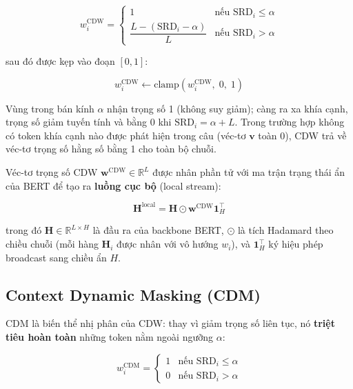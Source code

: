 \begin{equation}
  w_i^{\mathrm{CDW}} = \begin{cases}
    1 & \text{nếu } \mathrm{SRD}_i \leq \alpha \\[6pt]
    \dfrac{L - (\mathrm{SRD}_i - \alpha)}{L}
      & \text{nếu } \mathrm{SRD}_i > \alpha
  \end{cases}
  \label{eq:cdw}
\end{equation}

\noindent sau đó được kẹp vào đoạn $[0, 1]$:

\begin{equation}
  w_i^{\mathrm{CDW}} \leftarrow \mathrm{clamp}\!\left(
    w_i^{\mathrm{CDW}},\; 0,\; 1
  \right)
  \label{eq:cdw_clamp}
\end{equation}

Vùng trong bán kính $\alpha$ nhận trọng số 1 (không suy giảm); càng
ra xa khía cạnh, trọng số giảm tuyến tính và bằng 0 khi
$\mathrm{SRD}_i = \alpha + L$.  Trong trường hợp không có token khía
cạnh nào được phát hiện trong câu (véc-tơ $\mathbf{v}$ toàn 0), CDW
trả về véc-tơ trọng số hằng số bằng 1 cho toàn bộ chuỗi.

Véc-tơ trọng số CDW $\mathbf{w}^{\mathrm{CDW}} \in \mathbb{R}^L$ được
nhân phần tử với ma trận trạng thái ẩn của BERT để tạo ra
\textbf{luồng cục bộ} (local stream):

\begin{equation}
  \mathbf{H}^{\mathrm{local}} = \mathbf{H} \odot
    \mathbf{w}^{\mathrm{CDW}} \mathbf{1}_{H}^{\top}
  \label{eq:local_cdw}
\end{equation}

\noindent trong đó $\mathbf{H} \in \mathbb{R}^{L \times H}$ là đầu ra
của backbone BERT, $\odot$ là tích Hadamard theo chiều chuỗi (mỗi
hàng $\mathbf{H}_i$ được nhân với vô hướng $w_i$), và
$\mathbf{1}_{H}^{\top}$ ký hiệu phép broadcast sang chiều ẩn $H$.

\subsection{Context Dynamic Masking (CDM)}
\label{subsec:cdm}

CDM là biến thể nhị phân của CDW: thay vì giảm trọng số liên tục, nó
\textbf{triệt tiêu hoàn toàn} những token nằm ngoài ngưỡng $\alpha$:

\begin{equation}
  w_i^{\mathrm{CDM}} = \begin{cases}
    1 & \text{nếu } \mathrm{SRD}_i \leq \alpha \\[4pt]
    0 & \text{nếu } \mathrm{SRD}_i > \alpha
  \end{cases}
  \label{eq:cdm}
\end{equation}


